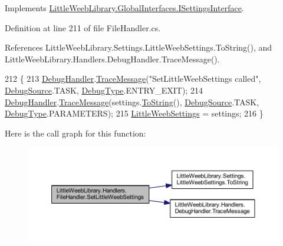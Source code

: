 Implements \mbox{\hyperlink{interface_little_weeb_library_1_1_global_interfaces_1_1_i_settings_interface_a5c53e44105f1f4c7f8c3e546d29939d7}{Little\+Weeb\+Library.\+Global\+Interfaces.\+I\+Settings\+Interface}}.



Definition at line 211 of file File\+Handler.\+cs.



References Little\+Weeb\+Library.\+Settings.\+Little\+Weeb\+Settings.\+To\+String(), and Little\+Weeb\+Library.\+Handlers.\+Debug\+Handler.\+Trace\+Message().


\begin{DoxyCode}
212         \{
213             \mbox{\hyperlink{class_little_weeb_library_1_1_handlers_1_1_file_handler_a131760e1828cd7ae1df2e90e9f300426}{DebugHandler}}.\mbox{\hyperlink{interface_little_weeb_library_1_1_handlers_1_1_i_debug_handler_a2e405bc3492e683cd3702fae125221bc}{TraceMessage}}(\textcolor{stringliteral}{"SetLittleWeebSettings called"}, 
      \mbox{\hyperlink{namespace_little_weeb_library_1_1_handlers_a2a6ca0775121c9c503d58aa254d292be}{DebugSource}}.TASK, \mbox{\hyperlink{namespace_little_weeb_library_1_1_handlers_ab66019ed40462876ec4e61bb3ccb0a62}{DebugType}}.ENTRY\_EXIT);
214             \mbox{\hyperlink{class_little_weeb_library_1_1_handlers_1_1_file_handler_a131760e1828cd7ae1df2e90e9f300426}{DebugHandler}}.\mbox{\hyperlink{interface_little_weeb_library_1_1_handlers_1_1_i_debug_handler_a2e405bc3492e683cd3702fae125221bc}{TraceMessage}}(settings.\mbox{\hyperlink{class_little_weeb_library_1_1_settings_1_1_little_weeb_settings_a5a5b722dd8e117be810022882795b6ae}{ToString}}(), 
      \mbox{\hyperlink{namespace_little_weeb_library_1_1_handlers_a2a6ca0775121c9c503d58aa254d292be}{DebugSource}}.TASK, \mbox{\hyperlink{namespace_little_weeb_library_1_1_handlers_ab66019ed40462876ec4e61bb3ccb0a62}{DebugType}}.PARAMETERS);
215             \mbox{\hyperlink{class_little_weeb_library_1_1_settings_1_1_little_weeb_settings}{LittleWeebSettings}} = settings;
216         \}
\end{DoxyCode}
Here is the call graph for this function\+:\nopagebreak
\begin{figure}[H]
\begin{center}
\leavevmode
\includegraphics[width=350pt]{class_little_weeb_library_1_1_handlers_1_1_file_handler_a81ebb3e28e77c5fc30acaf7d769ba8df_cgraph}
\end{center}
\end{figure}


